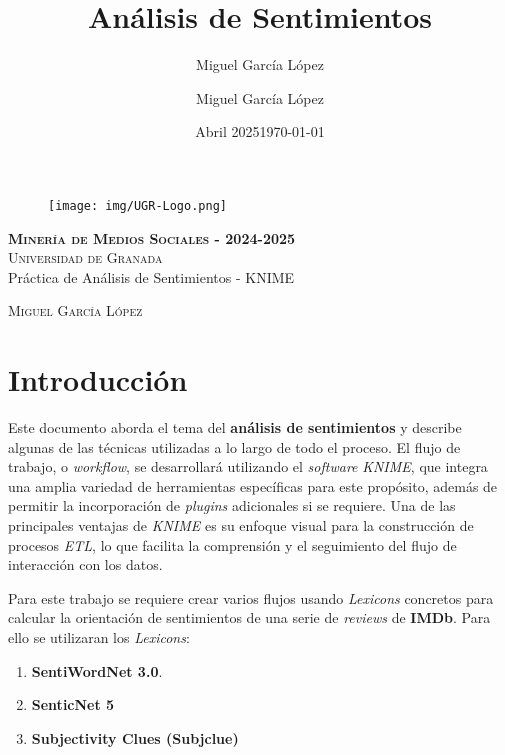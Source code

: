 \documentclass[12pt,letterpaper]{article}
\title{Análisis de Sentimientos}
\author{Miguel García López}
\date{Abril 2025}
\author{Miguel García López} %
\date{\normalsize\today} %
\begin{document}
\begin{titlepage}
    \begin{figure}
        \vspace{-1.3cm}
        \begin{center}
            \texttt{[image: img/UGR-Logo.png]}
        \end{center}
    \end{figure}
    \vspace{1.3cm}
    \centering
    \normalfont \normalsize
    \textsc{\textbf{Minería de Medios Sociales - 2024-2025} \\\vspace{.15cm} Universidad de Granada} \\ [25pt]
    \huge Práctica de Análisis de Sentimientos - KNIME

    \normalfont \normalsize \vspace{.30cm}
    \textsc{Miguel García López}

\end{titlepage}

\tableofcontents
\listoffigures
\listoftables
\newpage

\section{Introducción}
Este documento aborda el tema del \textbf{análisis de sentimientos} y describe algunas de las técnicas utilizadas a lo largo de todo el proceso. El flujo de trabajo, o \textit{workflow}, se desarrollará utilizando el \textit{software} \textit{KNIME}, que integra una amplia variedad de herramientas específicas para este propósito, además de permitir la incorporación de \textit{plugins} adicionales si se requiere. Una de las principales ventajas de \textit{KNIME} es su enfoque visual para la construcción de procesos \textit{ETL}, lo que facilita la comprensión y el seguimiento del flujo de interacción con los datos.

Para este trabajo se requiere crear varios flujos usando \textit{Lexicons} concretos para calcular la orientación de sentimientos de una serie de \textit{reviews} de \textbf{IMDb}. Para ello se utilizaran los \textit{Lexicons}:
\begin{enumerate}
    \item \textbf{SentiWordNet 3.0}.
    \item \textbf{SenticNet 5}
    \item \textbf{Subjectivity Clues (Subjclue)}
\end{enumerate}
\end{document}
